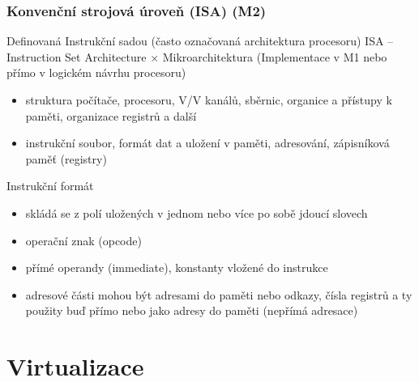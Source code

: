 \documentclass{beamer}
\begin{document}
\begin{frame}
\frametitle{Konvenční strojová úroveň (ISA) (M2)}

Definovaná Instrukční sadou (často označovaná architektura procesoru) ISA -- Instruction Set Architecture $\times$ Mikroarchitektura (Implementace v M1 nebo přímo v logickém návrhu procesoru)

\begin{itemize}
 \item struktura počítače, procesoru, V/V kanálů, sběrnic, organice a přístupy k paměti, organizace registrů a další
 \item instrukční soubor, formát dat a uložení v paměti, adresování, zápisníková paměť (registry)
\end{itemize}

Instrukční formát

\begin{itemize}
 \item skládá se z polí uložených v jednom nebo více po sobě jdoucí slovech
 \item operační znak (opcode)
 \item přímé operandy (immediate), konstanty vložené do instrukce
 \item adresové části mohou být adresami do paměti nebo odkazy, čísla registrů a ty použity buď přímo nebo jako adresy do paměti (nepřímá adresace)
\end{itemize}

\end{frame}

\section{Virtualizace}
\end{document}
